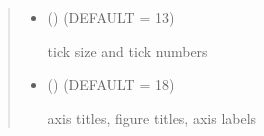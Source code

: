 \documentclass[letterpaper,10pt,english]{sphinxmanual}
\begin{document}
\begin{fulllineitems}
\begin{quote}
\begin{description}
\begin{itemize}
\item {} 
 (\sphinxstyleliteralemphasis{\sphinxupquote{, }}) \textendash{} 
(DEFAULT = 13)

tick size and tick numbers


\item {} 
 (\sphinxstyleliteralemphasis{\sphinxupquote{, }}) \textendash{} 
(DEFAULT = 18)

axis titles, figure titles, axis labels


\end{itemize}

\end{description}\end{quote}

\end{fulllineitems}

\end{document}
